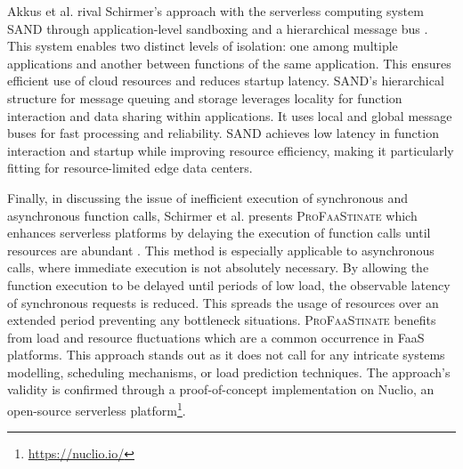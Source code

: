 Akkus et al. rival Schirmer's approach with the serverless computing system SAND
through application-level sandboxing and a hierarchical message bus
\cite{akkus2018sand}. This system enables two distinct levels of isolation: one
among multiple applications and another between functions of the same
application. This ensures efficient use of cloud resources and reduces startup
latency. SAND's hierarchical structure for message queuing and storage leverages
locality for function interaction and data sharing within applications. It uses
local and global message buses for fast processing and reliability. SAND
achieves low latency in function interaction and startup while improving
resource efficiency, making it particularly fitting for resource-limited edge
data centers.


Finally, in discussing the issue of inefficient execution of synchronous and
asynchronous function calls, Schirmer et al. presents \textsc{ProFaaStinate}
which enhances serverless platforms by delaying the execution of function calls
until resources are abundant \cite{schirmer2023profaastinate}. This method is
especially applicable to asynchronous calls, where immediate execution is not
absolutely necessary. By allowing the function execution to be delayed until
periods of low load, the observable latency of synchronous requests is reduced.
This spreads the usage of resources over an extended period preventing any
bottleneck situations. \textsc{ProFaaStinate} benefits from load and resource
fluctuations which are a common occurrence in FaaS platforms. This approach
stands out as it does not call for any intricate systems modelling, scheduling
mechanisms, or load prediction techniques. The approach's validity is confirmed
through a proof-of-concept implementation on Nuclio, an open-source serverless
platform\footnote{\url{https://nuclio.io/}}.


